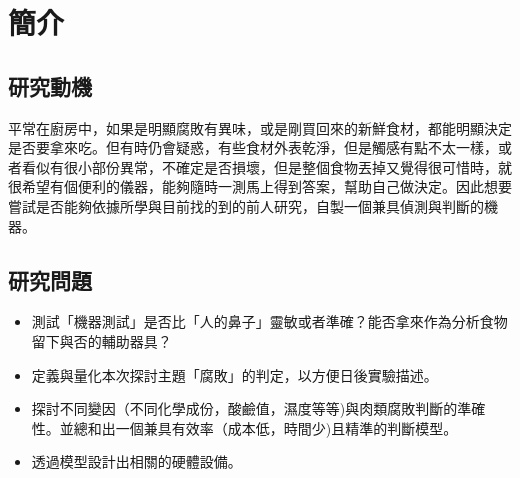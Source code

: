 \chapter{簡介}

\section{研究動機}
平常在廚房中，如果是明顯腐敗有異味，或是剛買回來的新鮮食材，都能明顯決定是否要拿來吃。但有時仍會疑惑，有些食材外表乾淨，但是觸感有點不太一樣，或者看似有很小部份異常，不確定是否損壞，但是整個食物丟掉又覺得很可惜時，就很希望有個便利的儀器，能夠隨時一測馬上得到答案，幫助自己做決定。因此想要嘗試是否能夠依據所學與目前找的到的前人研究，自製一個兼具偵測與判斷的機器。

\section{研究問題}
\begin{itemize}
\item 測試「機器測試」是否比「人的鼻子」靈敏或者準確？能否拿來作為分析食物留下與否的輔助器具？
\item 定義與量化本次探討主題「腐敗」的判定，以方便日後實驗描述。
\item 探討不同變因（不同化學成份，酸鹼值，濕度等等)與肉類腐敗判斷的準確性。並總和出一個兼具有效率（成本低，時間少)且精準的判斷模型。
\item 透過模型設計出相關的硬體設備。
\end{itemize}